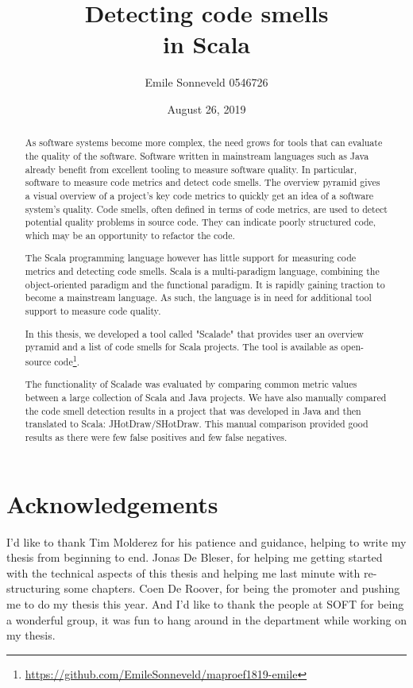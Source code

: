 \documentclass[onecolumn]{article}
\title{Detecting code smells \\in Scala}
\author{Emile Sonneveld 0546726}
\date{August 26, 2019}
\let\oldsection\section
\renewcommand\section{\clearpage\oldsection}
\begin{document}
\maketitle

\begin{abstract}
As software systems become more complex, the need grows for tools that can evaluate the quality of the software. Software written in mainstream languages such as Java already benefit from excellent tooling to measure software quality. In particular, software to measure code metrics and detect code smells. The overview pyramid gives a visual overview of a project's key code metrics to quickly get an idea of a software system's quality. Code smells, often defined in terms of code metrics, are used to detect potential quality problems in source code. They can indicate poorly structured code, which may be an opportunity to refactor the code.

The Scala programming language however has little support for measuring code metrics and detecting code smells. Scala is a multi-paradigm language, combining the object-oriented paradigm and the functional paradigm. It is rapidly gaining traction to become a mainstream language. As such, the language is in need for additional tool support to measure code quality.
    
In this thesis, we developed a tool called "Scalade" that provides user an overview pyramid and a list of code smells for Scala projects. The tool is available as open-source code\footnote{\url{https://github.com/EmileSonneveld/maproef1819-emile}}.

The functionality of Scalade was evaluated by comparing common metric values between a large collection of Scala and Java projects. We have also manually compared the code smell detection results in a project that was developed in Java and then translated to Scala: JHotDraw/SHotDraw. This manual comparison provided good results as there were few false positives and few false negatives.
\end{abstract}

\newpage



\section{Acknowledgements}
I'd like to thank Tim Molderez for his patience and guidance, helping to write my thesis from beginning to end. Jonas De Bleser, for helping me getting started with the technical aspects of this thesis and helping me last minute with re-structuring some chapters. Coen De Roover, for being the promoter and pushing me to do my thesis this year. And I’d like to thank the people at SOFT for being a wonderful group, it was fun to hang around in the department while working on my thesis.
\end{document}
